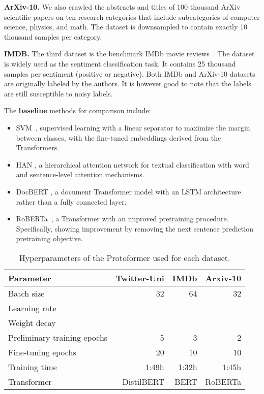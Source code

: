 \documentclass[letterpaper]{article} \usepackage{aaai22}  \usepackage{times}  \usepackage{helvet}  \usepackage{courier}  \usepackage{amsmath,amssymb}
\begin{document}
\textbf{ArXiv-10.} We also crawled the abstracts and titles of 100 thousand ArXiv scientific papers on ten research categories that include subcategories of computer science, physics, and math. The dataset is downsampled to contain exactly 10 thousand samples per category.

\textbf{IMDB.} The third dataset is the benchmark IMDb movie reviews~\cite{IMDBdataset}. The dataset is widely used as the sentiment classification task. It contains 25 thousand samples per sentiment (positive or negative). Both IMDb and ArXiv-10 datasets are originally labeled by the authors. It is however good to note that the labels are still susceptible to noisy labels.


The {\bf baseline} methods for comparison include:
\begin{itemize}
\item SVM~\cite{svm2003}, supervised learning with a linear separator to maximize the margin between classes, with the fine-tuned embeddings derived from the Transformers. 
\item HAN \cite{krishnan2017structured}, a hierarchical attention network for textual classification with word and sentence-level attention mechanisms. \item DocBERT \cite{adhikari2019docbert}, a document Transformer model with an LSTM architecture rather than a fully connected layer.
\item RoBERTa~\cite{liu2019roberta}, a Transformer with an improved
pretraining procedure. Specifically, showing improvement by removing the next sentence prediction pretraining objective.
\end{itemize}




\begin{table}[!h]
 \centering
 \caption{Hyperparameters of the Protoformer used for each dataset.} 
\begin{tabular}{lrrr}
\hline Parameter & Twitter-Uni & IMDb & Arxiv-10 \\
\hline Batch size & 32 & 64 & 32 \\
Learning rate &  &  &  \\
Weight decay &  &  &  \\
Preliminary training epochs & 5 & 3 & 2 \\
Fine-tuning epochs & 20 & 10 & 10 \\
Training time & 1:49h & 1:32h & 1:45h \\
Transformer & DistilBERT & BERT & RoBERTa \\

\hline
\end{tabular} 

 \label{tab:hyper}

\end{table}
\end{document}
